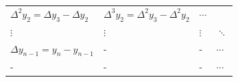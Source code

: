 \documentclass[]{book}
\begin{document}
\begin{longtable}[]{@{}llll@{}}
\begin{minipage}[t]{0.29\columnwidth}
\(\Delta^2 y_2 = \Delta y_{3} - \Delta y_2\)\strut
\end{minipage} & \begin{minipage}[t]{0.31\columnwidth}\raggedright
\(\Delta^3 y_2 = \Delta^2 y_{3} - \Delta^2 y_2\)\strut
\end{minipage} & \begin{minipage}[t]{0.06\columnwidth}\raggedright
\(\cdots\)\strut
\end{minipage}\tabularnewline
\begin{minipage}[t]{0.22\columnwidth}\raggedright
\(\vdots\)\strut
\end{minipage} & \begin{minipage}[t]{0.29\columnwidth}\raggedright
\(\vdots\)\strut
\end{minipage} & \begin{minipage}[t]{0.31\columnwidth}\raggedright
\(\vdots\)\strut
\end{minipage} & \begin{minipage}[t]{0.06\columnwidth}\raggedright
\(\ddots\)\strut
\end{minipage}\tabularnewline
\begin{minipage}[t]{0.22\columnwidth}\raggedright
\(\Delta y_{n-1} = y_{n} - y_{n-1}\)\strut
\end{minipage} & \begin{minipage}[t]{0.29\columnwidth}\raggedright
-\strut
\end{minipage} & \begin{minipage}[t]{0.31\columnwidth}\raggedright
-\strut
\end{minipage} & \begin{minipage}[t]{0.06\columnwidth}\raggedright
\(\cdots\)\strut
\end{minipage}\tabularnewline
\begin{minipage}[t]{0.22\columnwidth}\raggedright
-\strut
\end{minipage} & \begin{minipage}[t]{0.29\columnwidth}\raggedright
-\strut
\end{minipage} & \begin{minipage}[t]{0.31\columnwidth}\raggedright
-\strut
\end{minipage} & \begin{minipage}[t]{0.06\columnwidth}\raggedright
\(\cdots\)\strut
\end{minipage}\tabularnewline
\bottomrule
\end{longtable}
\end{document}
